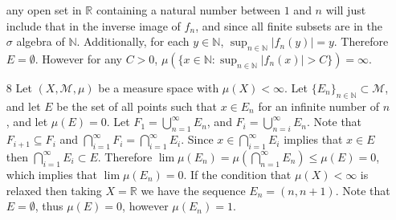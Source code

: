 \documentclass[12pt, letterpaper]{article}
\newcommand{\N}{\mathbb{N}}
\newcommand{\R}{\mathbb{R}}
\begin{document}
\begin{enumerate}
	 any open set in $\R$ containing a natural number between $1$ and $n$ will 
	 just include that in the inverse image of $f_n$, and since all finite subsets are 
	 in the $\sigma$ algebra of $\N$.
	 Additionally, for each $y \in \N$, $\sup_{n \in \N} |f_n(y)| = y$.  Therefore 
	 $E = \emptyset$.  However for any $C> 0$, $\mu (\{x \in \N: \sup_{n \in \N}|f_n(x)| > C\}) = \infty$.    
	\item[8] Let $(X, \mathcal{M}, \mu)$ be a measure space with $\mu(X) < \infty$.  
	Let $\{E_n\}_{n \in \N} \subset \mathcal{M}$, and let $E$ be the set of 
	all points such that $x \in E_n$ for an infinite number of $n$, and let $\mu(E) = 0$.  Let $F_1 = \bigcup_{n=1}^\infty E_n$, and $F_i = \bigcup_{n = i}^\infty E_n$.
	Note that $F_{i+1} \subseteq F_i$ and $\bigcap_{i=1}^\infty F_i = \bigcap_{i=1}^\infty E_i$.  Since $x \in \bigcap_{i=1}^\infty E_i$ implies that $x \in E$ then 
	$\bigcap_{i=1}^\infty E_i \subset E$.  Therefore $\lim \mu(E_n) = \mu(\bigcap_{n=1}^\infty E_n) \leq \mu(E) = 0$, which implies that $\lim \mu(E_n) = 0$.  If the condition 
	that $\mu(X) < \infty$ is relaxed then taking $X = \R$ we have the sequence 
	$E_n = (n,n+1)$.  Note that $E = \emptyset$, thus $\mu(E) = 0$, however 
	$\mu(E_n) = 1$.  
\end{enumerate}
\end{document}
